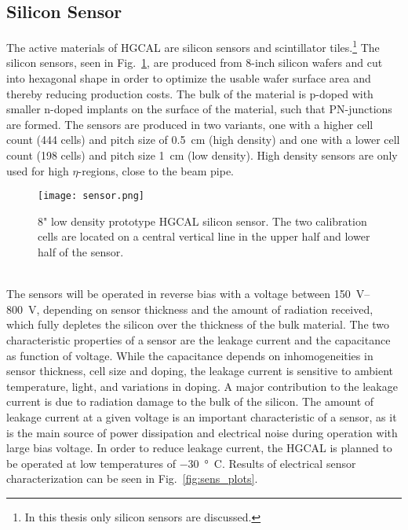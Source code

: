 \documentclass[../../main.tex]{subfiles}
\begin{document}
\subsection{Silicon Sensor}\label{sec:sensors}
The active materials of HGCAL are silicon sensors and scintillator tiles.\footnote{In this thesis only silicon sensors are discussed.} The silicon sensors, seen in Fig.~\ref{fig:sens}, are produced from 8-inch silicon wafers and cut into hexagonal shape in order to optimize the usable wafer surface area and thereby reducing production costs. The bulk of the material is p-doped with smaller n-doped implants on the surface of the material, such that PN-junctions are formed. The sensors are produced in two variants, one with a higher cell count (444 cells) and pitch size of \SI{0.5}{cm} (high density) and one with a lower cell count (198 cells) and pitch size \SI{1}{cm} (low density). High density sensors are only used for high $\eta$-regions, close to the beam pipe.\\
\begin{figure}[htp]
			\begin{center}
				\texttt{[image: sensor.png]}
				\caption{8" low density prototype HGCAL silicon sensor. The two calibration cells are located on a central vertical line in the upper half and lower half of the sensor.}
				\label{fig:sens}
			\end{center}
\end{figure}
\\
The sensors will be operated in reverse bias with a voltage between \SIrange{150}{800}{V}, depending on sensor thickness and the amount of radiation received, which fully depletes the silicon over the thickness of the bulk material. The two characteristic properties of a sensor are the leakage current and the capacitance as function of voltage. While the capacitance depends on inhomogeneities in sensor thickness, cell size and doping, the leakage current is sensitive to ambient temperature, light, and variations in doping. A major contribution to the leakage current is due to radiation damage to the bulk of the silicon. The amount of leakage current at a given voltage is an important characteristic of a sensor, as it is the main source of power dissipation and electrical noise during operation with large bias voltage. In order to reduce leakage current, the HGCAL is planned to be operated at low temperatures of \SI{-30}{\degree C}. Results of electrical sensor characterization can be seen in Fig.~\ref{fig:sens_plots}.\\
\end{document}
